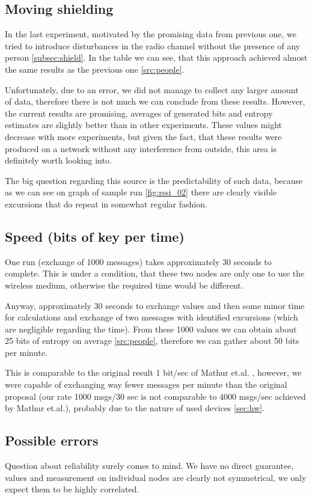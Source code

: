 \documentclass[
  print, %
  Table,   %
  nolof,     %
  nolot,     %
           oneside
]{fithesis3}
\begin{document}
  \subsection{Moving shielding}\label{src:shield}
  In the last experiment, motivated by the promising data from previous one, we tried to introduce disturbances in the radio channel without the presence of any person \ref{subsec:shield}. In the table we can see, that this approach achieved almost the same results as the previous one \ref{src:people}.

  Unfortunately, due to an error, we did not manage to collect any larger amount of data, therefore there is not much we can conclude from these results. However, the current results are promising, averages of generated bits and entropy estimates are slightly better than in other experiments.  These values might decrease with more experiments, but given the fact, that these results were produced on a network without any interference from outside, this area is definitely worth looking into.

  The big question regarding this source is the predictability of such data, because as we can see on graph of sample run \ref{fig:rssi_02}
  there are clearly visible excursions that do repeat in somewhat regular fashion.


  \subsection{Speed (bits of key per time)}
  One run (exchange of 1000 messages) takes approximately 30 seconds to complete. This is under a condition, that these two nodes are only one to use the wireless medium, otherwise the required time would be different.

  Anyway, approximately 30 seconds to exchange values and then some minor time for calculations and exchange of two messages with identified excursions (which are negligible regarding the time).  From these 1000 values we can obtain about 25 bits of entropy on average \ref{src:people}, therefore we can gather about 50 bits per minute.

  This is comparable to the original result 1 bit/sec of Mathur et.al. \cite{Mathur2008Rssi}, however, we were capable of exchanging way fewer messages per minute than the original proposal (our rate 1000 msgs/30 sec is not comparable to 4000 msgs/sec achieved by Mathur et.al.), probably due to the nature of used devices \ref{sec:hw}.
  \subsection{Possible errors}
  Question about reliability surely comes to mind. We have no direct guarantee, values and measurement on individual nodes are clearly not symmetrical, we only expect them to be highly correlated.
\end{document}
